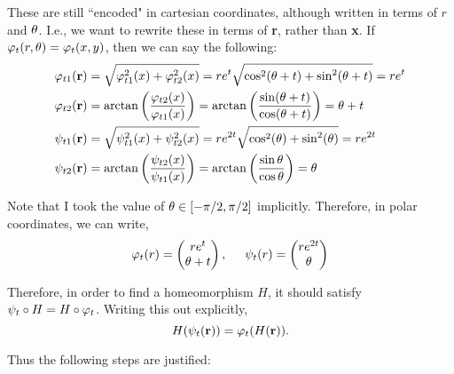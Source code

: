 \begin{solution}
    These are still ``encoded" in cartesian coordinates, although written in terms of $r$ and $\theta$. I.e., we want to rewrite these in terms of \textbf{r}, rather than \textbf{x}. If $\varphi_t(r, \theta) = \varphi_t(x, y)$, then we can say the following:
    \begin{align}
        \varphi_{t1}(\textbf{r}) &= \sqrt{\varphi_{t1}^2(x) + \varphi_{t2}^2(x)} = re^t\sqrt{\cos^2(\theta + t) + \sin^2(\theta + t)} = re^t \nonumber\\
        \varphi_{t2}(\textbf{r}) &= \arctan\bigg( \frac{\varphi_{t2}(x)}{\varphi_{t1}(x)} \bigg) = \arctan\bigg( \frac{\sin(\theta + t)}{\cos (\theta + t)} \bigg) = \theta + t\nonumber\\
        \psi_{t1}(\textbf{r}) &= \sqrt{\psi_{t1}^2(x) + \psi_{t2}^2(x)} = re^{2t}\sqrt{\cos^2(\theta) + \sin^2(\theta)} = re^{2t}\nonumber\\
        \psi_{t2}(\textbf{r}) &= \arctan\bigg( \frac{\psi_{t2}(x)}{\psi_{t1}(x)} \bigg) = \arctan\bigg( \frac{\sin\theta}{\cos \theta} \bigg) = \theta \nonumber
    \end{align}


    Note that I took the value of $\theta \in [-\pi/2, \pi/2]$ implicitly. Therefore, in polar coordinates, we can write,
    \alignbreak
    \begin{align}
            \varphi_t(r)  =  
        \begin{pmatrix}
            re^t\\
            \theta + t
        \end{pmatrix}
        ,
        \hspace{5mm}
    \psi_t(r)   =   
        \begin{pmatrix}
            re^{2t}\\
            \theta
        \end{pmatrix}\nonumber
    \end{align}
    \alignbreak

    \newpage
    Therefore, in order to find a homeomorphism $H$, it should satisfy $\psi_t \circ H = H \circ \varphi_t$. Writing this out explicitly, 
    \[
    H(\psi_t(\textbf{r})) = \varphi_t(H(\textbf{r})).
    \]

    Thus the following steps are justified:


\end{solution}
